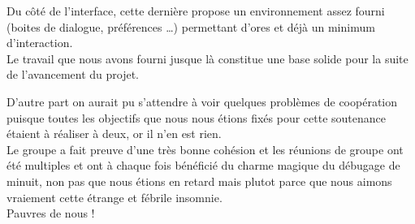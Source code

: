 \documentclass[14pt,a4paper]{report}
\begin{document}
Du c\^ot\'e de l'interface, cette derni\`ere propose un environnement
assez fourni (boites de dialogue, pr\'ef\'erences \ldots) 
permettant d'ores et d\'ej\`a un minimum d'interaction. \\

Le travail que nous avons fourni jusque l\`a constitue une base solide
pour la suite de l'avancement du projet.

D'autre part on aurait pu s'attendre \`a voir quelques probl\`emes
de coop\'eration puisque toutes les objectifs que nous nous \'etions
fix\'es pour cette soutenance \'etaient \`a r\'ealiser \`a deux,
or il n'en est rien. \\

Le groupe a fait preuve d'une tr\`es bonne coh\'esion et les
r\'eunions de groupe ont \'et\'e multiples et ont \`a chaque fois
b\'en\'efici\'e du charme magique du d\'ebugage de minuit, non
pas que nous \'etions en retard mais plutot parce que nous
aimons vraiement cette \'etrange et f\'ebrile insomnie. \\

Pauvres de nous !
\end{document}
